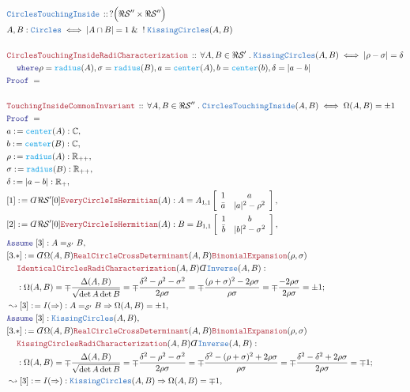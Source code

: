 \documentclass[12pt]{scrartcl}
\newcommand{\TYPE}[1]{\textcolor{NavyBlue}{\mathtt{#1}}}
\newcommand{\FUNC}[1]{\textcolor{Cerulean}{\mathtt{#1}}}
\newcommand{\LOGIC}[1]{\textcolor{Blue}{\mathtt{#1}}}
\newcommand{\THM}[1]{\textcolor{Maroon}{\mathtt{#1}}}
\renewcommand{\.}{\; . \;}
\newcommand{\de}{: \kern 0.1pc =}
\newcommand{\where}{\LOGIC{where}}
\newcommand{\IsNot}{\; ! \;}
\newcommand{\Theorem}[2]{& \THM{#1} \, :: \, #2 \\ & \Proof = \\ }
\newcommand{\DeclareType}[2]{& \TYPE{#1} \, :: \, #2 \\}
\newcommand{\DefineType}[3]{& #1 : \TYPE{#2} \iff #3 \\}
\newcommand{\NewLine}{\\ & \kern 1pc}
\newcommand{\Page}[1]{ \begin{align*} #1 \end{align*}   }
\newcommand{ \bd }{ \ByDef }
\renewcommand{\And}{\; \& \;}
\newcommand{\Imply}{\Rightarrow}
\newcommand{\Reals}{\mathbb{R} }
\newcommand{\Complex}{\mathbb{C}}
\newcommand{\Say}[3]{& #1 \de #2 : #3, \\}
\newcommand{\Conclude}[3]{& #1 \de #2 : #3; \\}
\newcommand{\Derive}[3]{& \leadsto #1 \de #2 : #3, \\}
\newcommand{\Assume}[2]{& \LOGIC{Assume} \; #1 : #2, \\}
\newcommand{\ByDef}{\rotatebox[origin=c]{-180}{$D$}}%
\newcommand{\Proof}{\LOGIC{Proof} \; }
\renewcommand{\S}{\mathcal{S}}
\begin{document}
\Page{
	\DeclareType{CirclesTouchingInside}{?\Big(\Re \S'' \times \Re \S''\Big)}
	\DefineType{A,B}{Circles}{|  A \cap   B| = 1  \And \IsNot \TYPE{KissingCircles}(A,B)}
	\\
	\Theorem{CirclesTouchingInsideRadiCharacterization}
	{
		\forall A,B \in \Re \S' \.  \TYPE{KissingCircles}(A,B) \iff  |\rho - \sigma| = \delta \NewLine 
		\where
		\rho = \FUNC{radius}(A),
		\sigma = \FUNC{radius}(B),
		a =  \FUNC{center}(A),
		b = \FUNC{center}(b),
		\delta = |a - b|
	}
	\\	
	\Theorem{TouchingInsideCommonInvariant}
	{
		\forall  A,B \in \Re \S'' \.  \TYPE{CirclesTouchingInside}(A,B) \iff  \Omega(A,B) = \pm 1
	}
	\Say{a}{\FUNC{center}(A)}{\Complex}
	\Say{b}{\FUNC{center}(B)}{\Complex}
	\Say{\rho}{\FUNC{radius}(A)}{\Reals_{++}}
	\Say{\sigma}{\FUNC{radius}(B)}{\Reals_{++}}
	\Say{\delta}{|a - b|}{\Reals_+}
	\Say{[1]}{\bd \Re \S' [0]\THM{EveryCircleIsHermitian}(A)}
	{
		A =    A_{1,1}\left[      
		\begin{array}{cc}
			1 &  a  \\
			\bar{a}  &  |a|^2 - \rho^2   
		\end{array}
		\right] 
	}
	\Say{[2]}{\bd \Re \S' [0]\THM{EveryCircleIsHermitian}(A)}
	{
		B =    B_{1,1}\left[      
		\begin{array}{cc}
			1 &  b  \\
			\bar{b}  &  |b|^2 - \sigma^2   
		\end{array}
		\right] 
	}
	\Assume{[3]}{ A =_{\S'} B  }
	\Conclude{[3.*]}{\bd \Omega(A,B) \THM{RealCircleCrossDeterminant}(A,B) \THM{BinomialExpansion}(\rho,\sigma) \NewLine \THM{IdenticalCirclesRadiCharacterization}(A,B)\bd \TYPE{Inverse}(A,B)}
	{
		\NewLine :
		\Omega(A,B) =   
		\mp \frac{\Delta(A,B)}{\sqrt{\det A \det  B}} =
		\mp  \frac{\delta^2 - \rho^2 - \sigma^2 }{ 2\rho \sigma} =
		\mp  \frac{ (\rho + \sigma)^2 - 2\rho\sigma}{ \rho \sigma} = 
		\mp \frac{ - 2\rho\sigma}{2\rho\sigma} = \pm 1  
	}
	\Derive{[3]}{I(\Imply)}{ A =_{\S'} B \Imply \Omega(A,B) = \pm 1}
	\Assume{[3]}{\TYPE{KissingCircles}(A,B)}
	\Conclude{[3.*]}{\bd \Omega(A,B) \THM{RealCircleCrossDeterminant}(A,B) \THM{BinomialExpansion}(\rho,\sigma) \NewLine \THM{KissingCirclesRadiCharacterization}(A,B)\bd \TYPE{Inverse}(A,B)}
	{
		\NewLine :
		\Omega(A,B) =   
		\mp \frac{\Delta(A,B)}{\sqrt{\det A \det  B}} =
		\mp  \frac{\delta^2 - \rho^2 - \sigma^2 }{ 2\rho \sigma} =
		\mp  \frac{\delta^2 - (\rho + \sigma)^2 + 2\rho\sigma}{ \rho \sigma} = 
		\mp \frac{\delta^2 -  \delta^2 + 2\rho\sigma}{2\rho\sigma} = \mp 1  
	}
	\Derive{[3]}{I(\Imply)}{\TYPE{KissingCircles}(A,B) \Imply \Omega(A,B) = \mp 1}
}
\end{document}
